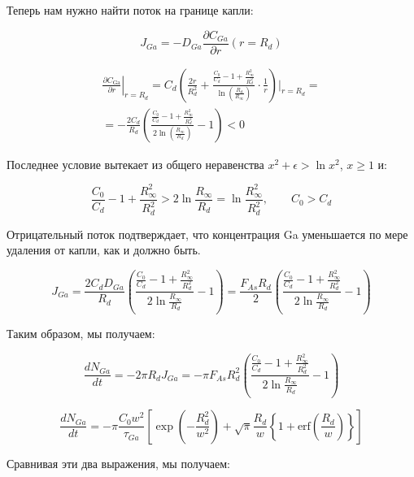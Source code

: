 \documentclass[14pt,oneside]{extarticle}
\begin{document}
Теперь нам нужно найти поток на границе капли:

\begin{equation}
    J_{Ga}=-D_{Ga}\frac{\partial C_{Ga}}{\partial r}\left(r=R_{d}\right)
\end{equation}

\begin{multline}
    \left. \frac{\partial C_{\text{Ga}}}{\partial r} \right|_{r = R_d}
    = C_d \left(
    \frac{2r}{R_d^2}
    + \frac{ \frac{C_0}{C_d} - 1 + \frac{R_\infty^2}{R_d^2} }{ \ln \left( \frac{R_d}{R_\infty} \right) } \cdot \frac{1}{r}
    \right) \Bigg|_{r = R_d} = \\
    = -\frac{2C_d}{R_d} \left(
    \frac{
    \frac{C_0}{C_d} - 1 + \frac{R_\infty^2}{R_d^2}
    }{
    2 \ln \left( \frac{R_\infty}{R_d} \right)
    }
    - 1
    \right) < 0
\end{multline} 

Последнее условие вытекает из общего неравенства $x^{2}+\epsilon>\ln x^{2}$,  $x\geq1$ и:

\[
\frac{C_{0}}{C_{d}}-1+\frac{R_{\infty}^{2}}{R_{d}^{2}}>2\ln\frac{R_{\infty}}{R_{d}}=\ln\frac{R_{\infty}^{2}}{R_{d}^{2}},\qquad C_{0}>C_{d}
\]

Отрицательный поток подтверждает, что концентрация Ga уменьшается по мере удаления от капли, как и должно быть.

\begin{equation}
    J_{Ga}=\frac{2C_{d}D_{Ga}}{R_{d}}\left(\frac{\frac{C_{0}}{C_{d}}-1+\frac{R_{\infty}^{2}}{R_{d}^{2}}}{2\ln\frac{R_{\infty}}{R_{d}}}-1\right)=\frac{F_{As}R_{d}}{2}\left(\frac{\frac{C_{0}}{C_{d}}-1+\frac{R_{\infty}^{2}}{R_{d}^{2}}}{2\ln\frac{R_{\infty}}{R_{d}}}-1\right)
\end{equation}

Таким образом, мы получаем:

\begin{equation}
    \frac{dN_{Ga}}{dt}=-2\pi R_{d}J_{Ga}=-\pi F_{As}R_{d}^{2}\left(\frac{\frac{C_{0}}{C_{d}}-1+\frac{R_{\infty}^{2}}{R_{d}^{2}}}{2\ln\frac{R_{\infty}}{R_{d}}}-1\right)
\end{equation}

\begin{equation}
    \frac{dN_{Ga}}{dt}=-\pi\frac{C_{0}w^{2}}{\tau_{Ga}}\left[\exp\left(-\frac{R_{d}^{2}}{w^{2}}\right)+\sqrt{\pi}\frac{R_{d}}{w}\left\{ 1+\text{erf}\left(\frac{R_{d}}{w}\right)\right\} \right]
\end{equation}

Сравнивая эти два выражения, мы получаем:
\end{document}
